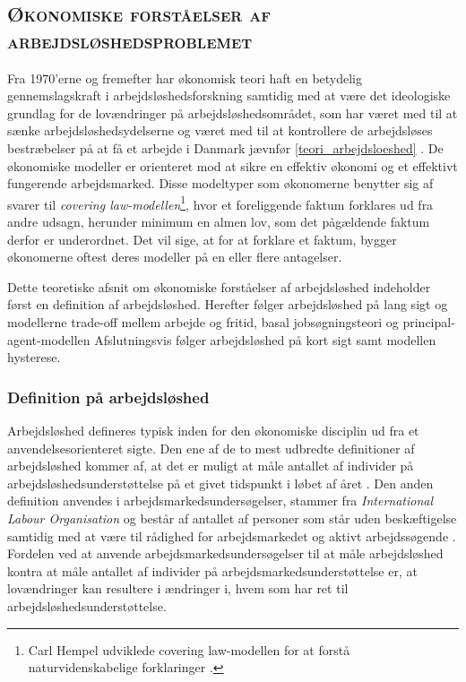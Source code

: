 \newpage \subsection{\textsc{Økonomiske forståelser af arbejdsløshedsproblemet}}

Fra 1970'erne og fremefter har økonomisk teori haft en betydelig gennemslagskraft i arbejdsløshedsforskning samtidig med at være det ideologiske grundlag for de lovændringer på arbejdsløshedsområdet, som har været med til at sænke arbejdsløshedsydelserne og været med til at kontrollere de arbejdsløses bestræbelser på at få et arbejde i Danmark jævnfør \ref{teori_arbejdsloeshed} \parencite[19]{Andersen2003} \parencite[1679]{Atkinson1991}. De økonomiske modeller er orienteret mod at sikre en effektiv økonomi og et effektivt fungerende arbejdsmarked. Disse modeltyper som økonomerne benytter sig af svarer til \textit{covering law-modellen}\footnote{Carl Hempel udviklede covering law-modellen for at forstå naturvidenskabelige forklaringer \parencite[15]{Hedstroem2005}.}, hvor et foreliggende faktum forklares ud fra andre udsagn, herunder minimum en almen lov, som det pågældende faktum derfor er underordnet. Det vil sige, at for at forklare et faktum, bygger økonomerne oftest deres modeller på en eller flere antagelser.

Dette teoretiske afsnit om økonomiske forståelser af arbejdsløshed indeholder først en definition af arbejdsløshed. Herefter følger arbejdsløshed på lang sigt og modellerne trade-off mellem arbejde og fritid, basal jobsøgningsteori og principal-agent-modellen  Afslutningsvis følger arbejdsløshed på kort sigt samt modellen hysterese.


\subsubsection{Definition på arbejdsløshed} %

Arbejdsløshed defineres typisk inden for den økonomiske disciplin ud fra et anvendelsesorienteret sigte. Den ene af de to mest udbredte definitioner af arbejdsløshed kommer af, at det er muligt at måle antallet af individer på arbejdsløshedsunderstøttelse på et givet tidspunkt i løbet af året \parencite[594]{Mankiw2011}. Den anden definition anvendes i arbejdsmarkedsundersøgelser, stammer fra \textit{International Labour Organisation} og består af antallet af personer som står uden beskæftigelse samtidig med at være til rådighed for arbejdsmarkedet og aktivt arbejdssøgende \parencite{ILO1982}. Fordelen ved at anvende arbejdsmarkedsundersøgelser til at måle arbejdsløshed kontra at måle antallet af individer på arbejdsmarkedsunderstøttelse er, at lovændringer kan resultere i ændringer i, hvem som har ret til arbejdsløshedsunderstøttelse. %

